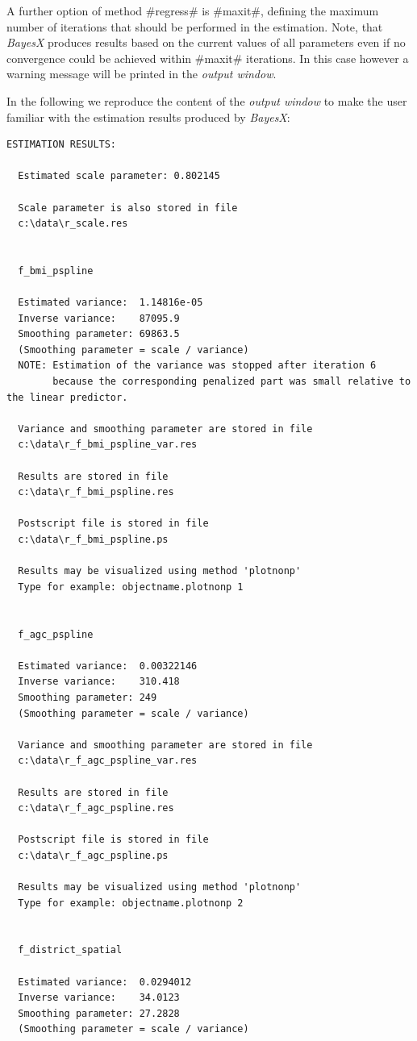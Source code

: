\documentclass[11pt,a4paper,twoside]{bayesxreport}
\begin{document}
A further option of method #regress# is #maxit#, defining the
maximum number of iterations that should be performed in the
estimation. Note, that {\it BayesX} produces results based on the
current values of all parameters even if no convergence could be
achieved within #maxit# iterations. In this case however a warning
message will be printed in the {\it output window}.

In the following we reproduce the content of the {\em output window}
to make the user familiar with the estimation results produced by
{\em BayesX}:

\footnotesize
\begin{verbatim}
ESTIMATION RESULTS:

  Estimated scale parameter: 0.802145

  Scale parameter is also stored in file
  c:\data\r_scale.res


  f_bmi_pspline

  Estimated variance:  1.14816e-05
  Inverse variance:    87095.9
  Smoothing parameter: 69863.5
  (Smoothing parameter = scale / variance)
  NOTE: Estimation of the variance was stopped after iteration 6
        because the corresponding penalized part was small relative to the linear predictor.

  Variance and smoothing parameter are stored in file
  c:\data\r_f_bmi_pspline_var.res

  Results are stored in file
  c:\data\r_f_bmi_pspline.res

  Postscript file is stored in file
  c:\data\r_f_bmi_pspline.ps

  Results may be visualized using method 'plotnonp'
  Type for example: objectname.plotnonp 1


  f_agc_pspline

  Estimated variance:  0.00322146
  Inverse variance:    310.418
  Smoothing parameter: 249
  (Smoothing parameter = scale / variance)

  Variance and smoothing parameter are stored in file
  c:\data\r_f_agc_pspline_var.res

  Results are stored in file
  c:\data\r_f_agc_pspline.res

  Postscript file is stored in file
  c:\data\r_f_agc_pspline.ps

  Results may be visualized using method 'plotnonp'
  Type for example: objectname.plotnonp 2


  f_district_spatial

  Estimated variance:  0.0294012
  Inverse variance:    34.0123
  Smoothing parameter: 27.2828
  (Smoothing parameter = scale / variance)


\end{verbatim}
\end{document}
